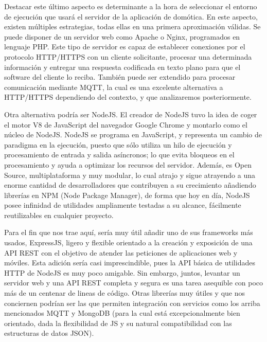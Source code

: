 \vspace{1cm}

Destacar este último aspecto es determinante a la hora de seleccionar el entorno de ejecución que usará el servidor de la aplicación de domótica. En este aspecto, existen múltiples estrategias, todas ellas en una primera aproximación válidas. Se puede disponer de un servidor web como Apache o Nginx, programados en lenguaje PHP. Este tipo de servidor es capaz de establecer conexiones por el protocolo HTTP/HTTPS con un cliente solicitante, procesar una determinada información y entregar una respuesta codificada en texto plano para que el software del cliente lo reciba. También puede ser extendido para procesar comunicación mediante MQTT, la cual es una excelente alternativa a HTTP/HTTPS dependiendo del contexto, y que analizaremos posteriormente.

\vspace{1cm}

Otra alternativa podría ser NodeJS. El creador de NodeJS tuvo la idea de coger el motor V8 de JavaScript del navegador Google Chrome y montarlo como el núcleo de NodeJS. NodeJS se programa en JavaScript, y representa un cambio de paradigma en la ejecución, puesto que sólo utiliza un hilo de ejecución y procesamiento de entrada y salida asíncronos; lo que evita bloqueos en el procesamiento y ayuda a optimizar los recursos del servidor.  Además, es Open Source, multiplataforma y muy modular, lo cual atrajo y sigue atrayendo a una enorme cantidad de desarrolladores que contribuyen a su crecimiento añadiendo librerías en NPM (Node Package Manager), de forma que hoy en día, NodeJS posee infinidad de utilidades ampliamente testadas a su alcance, fácilmente reutilizables en cualquier proyecto.

\vspace{1cm}

Para el fin que nos trae aquí, sería muy útil añadir uno de sus frameworks más usados, ExpressJS, ligero y flexible orientado a la creación y exposición de una API REST con el objetivo de atender las peticiones de aplicaciones web y móviles. Esta adición sería casi imprescindible, pues la API básica de utilidades HTTP de NodeJS es muy poco amigable. Sin embargo, juntos, levantar un servidor web y una API REST completa y segura es una tarea asequible con poco más de un centenar de lineas de código. Otras librerías muy útiles y que nos conciernen podrían ser las que permiten integración con servicios como los arriba mencionados MQTT y MongoDB (para la cual está excepcionalmente bien orientado, dada la flexibilidad de JS y su natural compatibilidad con las estructuras de datos JSON).

